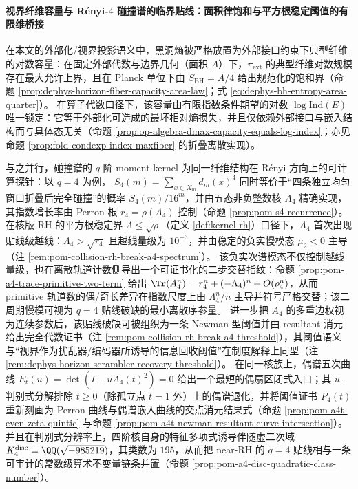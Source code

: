 \paragraph{视界纤维容量与 Rényi-\texorpdfstring{$4$}{4} 碰撞谱的临界贴线：面积律饱和与平方根稳定阈值的有限维桥接}
在本文的外部化/视界投影语义中，黑洞熵被严格放置为外部接口约束下典型纤维的对数容量：在固定外部代数与边界几何（面积 \(A\)）下，\(\pi_{\mathrm{ext}}\) 的典型纤维对数规模存在最大允许上界，且在 Planck 单位下由
\(
S_{\mathrm{BH}}=A/4
\)
给出规范化的饱和界（命题 \ref{prop:dephys-horizon-fiber-capacity-area-law}；式 \eqref{eq:dephys-bh-entropy-area-quarter}）。
在算子代数口径下，该容量由有限指数条件期望的对数 \(\log\mathrm{Ind}(E)\) 唯一锁定：它等于外部化可造成的最坏相对熵损失，并且仅依赖外部接口与嵌入结构而与具体态无关（命题 \ref{prop:op-algebra-dmax-capacity-equals-log-index}；亦见命题 \ref{prop:fold-condexp-index-maxfiber} 的折叠离散实现）。
\par
与之并行，碰撞谱的 \(q\)-阶 moment-kernel 为同一纤维结构在 Rényi 方向上的可计算探针：以 \(q=4\) 为例，
\(
S_4(m)=\sum_{x\in X_m} d_m(x)^4
\)
同时等价于“四条独立均匀窗口折叠后完全碰撞”的概率 \(S_4(m)/16^m\)，并由五态非负整数核 \(A_4\) 精确实现，其指数增长率由 Perron 根 \(r_4=\rho(A_4)\) 控制（命题 \ref{prop:pom-s4-recurrence}）。
在核版 RH 的平方根稳定界 \(\Lambda\le \sqrt{\rho}\)（定义 \ref{def:kernel-rh}）口径下，\(A_4\) 首次出现贴线级越线：\(\Lambda_4>\sqrt{r_4}\) 且越线量级为 \(10^{-3}\)，并由稳定的负实慢模态 \(\mu_2<0\) 主导（注 \ref{rem:pom-collision-rh-break-a4-spectrum}）。
该负实次谱模态不仅控制越线量级，也在离散轨道计数侧导出一个可证书化的二步交替指纹：命题 \ref{prop:pom-a4-trace-primitive-two-term} 给出
\(\Tr(A_4^n)=r_4^n+(-\Lambda_4)^n+O(\rho_4^n)\)，从而 primitive 轨道数的偶/奇长差异在指数尺度上由 \(\Lambda_4^n/n\) 主导并符号严格交替；该二周期慢模可视为 \(q=4\) 贴线破缺的最小离散序参量。
进一步把 \(A_4\) 的多重边权视为连续参数后，该贴线破缺可被组织为一条 Newman 型阈值并由 resultant 消元给出完全代数证书（注 \ref{rem:pom-collision-rh-break-a4-threshold}），其阈值语义与“视界作为扰乱器/编码器所诱导的信息回收阈值”在制度解释上同型（注 \ref{rem:dephys-horizon-scrambler-recovery-threshold}）。
在同一核族上，偶谱五次曲线 \(E_t(u)=\det(I-uA_4(t)^2)=0\) 给出一个最短的偶扇区闭式入口；其 \(u\)-判别式分解排除 \(t\ge 0\)（除孤立点 \(t=1\) 外）上的偶谱退化，并将阈值证书 \(P_4(t)\) 重新刻画为 Perron 曲线与偶谱嵌入曲线的交点消元结果式（命题 \ref{prop:pom-a4t-even-zeta-quintic} 与命题 \ref{prop:pom-a4t-newman-resultant-curve-intersection}）。
并且在判别式分辨率上，四阶核自身的特征多项式诱导伴随虚二次域 \(K_4^{\mathrm{disc}}=\QQ(\sqrt{-985219})\)，其类数为 \(195\)，从而把 near-RH 的 \(q=4\) 贴线相与一条可审计的常数级算术不变量链条并置（命题 \ref{prop:pom-a4-disc-quadratic-class-number}）。

